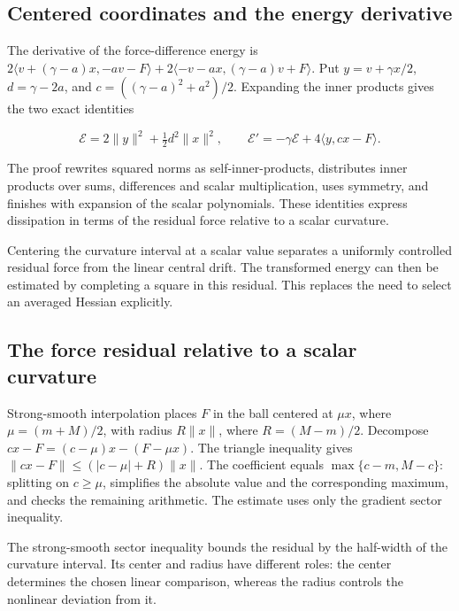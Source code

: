 \documentclass[11pt,a4paper]{report}
\begin{document}
\subsection{\texorpdfstring{Centered coordinates and the energy derivative}{Centered coordinates and the energy derivative}}
\label{report-step-KineticLangevin-GeneralContraction-lean-1}


The derivative of the force-difference energy is \(2\langle v+(\gamma-a)x,-av-F\rangle+2\langle-v-ax,(\gamma-a)v+F\rangle\). Put \(y=v+\gamma x/2\), \(d=\gamma-2a\), and \(c=((\gamma-a)^2+a^2)/2\). Expanding the inner products gives the two exact identities

\[\mathcal E=2\|y\|^2+\tfrac12d^2\|x\|^2,\qquad \mathcal E'=-\gamma\mathcal E+4\langle y,cx-F\rangle.\]

The proof rewrites squared norms as self-inner-products, distributes inner products over sums, differences and scalar multiplication, uses symmetry, and finishes with expansion of the scalar polynomials. These identities express dissipation in terms of the residual force relative to a scalar curvature.



Centering the curvature interval at a scalar value separates a uniformly controlled residual force from the linear central drift. The transformed energy can then be estimated by completing a square in this residual. This replaces the need to select an averaged Hessian explicitly.

\subsection{\texorpdfstring{The force residual relative to a scalar curvature}{The force residual relative to a scalar curvature}}
\label{report-step-KineticLangevin-GeneralContraction-lean-2}


Strong-smooth interpolation places \(F\) in the ball centered at \(\mu x\), where \(\mu=(m+M)/2\), with radius \(R\|x\|\), where \(R=(M-m)/2\). Decompose \(cx-F=(c-\mu)x-(F-\mu x)\). The triangle inequality gives \(\|cx-F\|\le(|c-\mu|+R)\|x\|\). The coefficient equals \(\max\{c-m,M-c\}\): splitting on \(c\ge\mu\), simplifies the absolute value and the corresponding maximum, and checks the remaining arithmetic. The estimate uses only the gradient sector inequality.



The strong-smooth sector inequality bounds the residual by the half-width of the curvature interval. Its center and radius have different roles: the center determines the chosen linear comparison, whereas the radius controls the nonlinear deviation from it.
\end{document}
